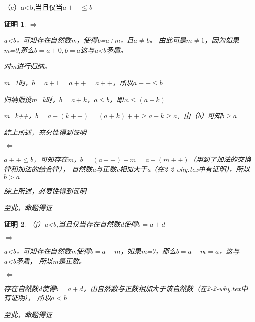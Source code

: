 \documentclass{article}
\theoremstyle{mystyle}
\theoremstyle{zproofstyle}
\newtheorem*{zproof}{证明}
\begin{document}
（e）a<b,当且仅当$a++ \leq b$
\begin{zproof}
    $\Rightarrow$

    a<b，可知存在自然数m，使得b=a+m，且$a \neq b$。
    由此可是$m \neq 0$，因为如果m=0,那么$b=a+0, b=a$这与a<b矛盾。

    对m进行归纳。

    m=1时，$b=a+1=a++=a++$，所以$a++ \leq b$

    归纳假设m=k时，$b=a+k$，$a \leq b$，即:$a \leq (a+k)$

    m=k++，$b=a+(k++)=(a+k)++ \geq a+k \geq a$，由（b）可知$b \geq a$

    综上所述，充分性得到证明

    $\Leftarrow$
    
    $a++ \leq b$，可知存在m，$b=(a++)+m=a+(m++)$（用到了加法的交换律和加法的结合律），
    自然数a与正数c相加大于a（在2-2-why.tex中有证明），所以$b > a$

    综上所述，必要性得到证明

    至此，命题得证
\end{zproof}

\begin{zproof}

    （f）a<b,当且仅当存在自然数d使得$b=a+d$

    $\Rightarrow$

    a<b，可知存在自然数m使得$b=a+m$，如果m=0，那么$b=a+m=a$，这与a<b矛盾，
    所以m是正数。

    $\Leftarrow$

    存在自然数d使得$b=a+d$，由自然数与正数相加大于该自然数（在2-2-why.tex中有证明），
    所以$a<b$

    至此，命题得证

\end{zproof}
\end{document}
